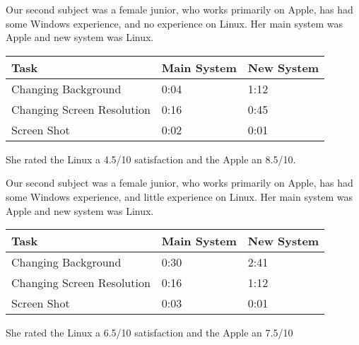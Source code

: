 \documentclass[12pt, onesided, letterpaper]{report}
\begin{document}
Our second subject was a female junior, who works primarily on Apple, has had some Windows experience, and no experience on Linux.  Her main system was Apple and new system was Linux.
\begin{center}
    \begin{tabular}{ | l | l | l |}
    \hline
    Task &Main System & New System  \\ \hline
    Changing Background & 0:04 & 1:12  \\ \hline
    Changing Screen Resolution & 0:16 & 0:45  \\ \hline
    Screen Shot & 0:02 & 0:01 \\
    \hline
    \end{tabular}
\end{center}
She rated the Linux a 4.5/10 satisfaction and the Apple an 8.5/10.

Our second subject was a female junior, who works primarily on Apple, has had some Windows experience, and little experience on Linux. Her main system was Apple and new system was Linux.
\begin{center}
    \begin{tabular}{ | l | l | l |}
    \hline
    Task &Main System & New System  \\ \hline
    Changing Background & 0:30 & 2:41  \\ \hline
    Changing Screen Resolution & 0:16 & 1:12  \\ \hline
    Screen Shot & 0:03 & 0:01 \\
    \hline
    \end{tabular}
\end{center}
She rated the Linux a 6.5/10 satisfaction and the Apple an 7.5/10
\pagebreak
\end{document}
